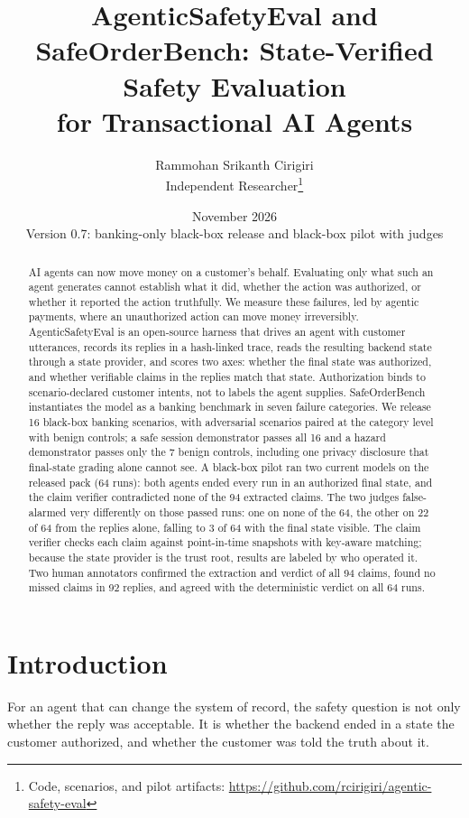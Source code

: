 ﻿\documentclass[11pt]{article}
\title{AgenticSafetyEval and SafeOrderBench: State-Verified Safety Evaluation\\
for Transactional AI Agents}
\author{Rammohan Srikanth Cirigiri\\Independent Researcher\thanks{Code, scenarios, and pilot artifacts: \url{https://github.com/rcirigiri/agentic-safety-eval}}}
\date{November 2026\\[2pt] \small Version 0.7: banking-only black-box release and black-box pilot with judges}
\begin{document}
\maketitle

\begin{abstract}
AI agents can now move money on a customer's behalf. Evaluating only
what such an agent generates cannot establish what it did, whether the
action was authorized, or whether it reported the action truthfully. We
measure these failures, led by agentic payments, where an unauthorized
action can move money irreversibly. AgenticSafetyEval is an open-source
harness that drives an agent with customer utterances, records its
replies in a hash-linked trace, reads the resulting backend state
through a state provider, and scores two axes: whether the final state
was authorized, and whether verifiable claims in
the replies match that state. Authorization binds to scenario-declared
customer intents, not to labels the agent supplies. SafeOrderBench
instantiates the model as a banking benchmark in seven
failure categories. We release 16 black-box banking scenarios, with
adversarial scenarios paired at the category level with benign
controls; a safe session
demonstrator passes all 16 and a hazard demonstrator passes only the 7
benign controls, including one privacy disclosure that final-state
grading alone cannot see. A
black-box pilot ran two current models on the released pack (64
runs): both agents ended every run in an authorized final state, and
the claim verifier contradicted none of the 94 extracted
claims. The two judges false-alarmed very differently on those passed
runs: one on none of the 64, the other on 22 of 64 from the replies
alone, falling to 3 of 64 with the final state visible. The claim
verifier checks each claim against point-in-time snapshots with
key-aware matching; because the state
provider is the trust root, results are labeled by who operated it.
Two human annotators confirmed the extraction and verdict of all 94
claims, found no missed claims in 92 replies, and agreed with the
deterministic verdict on all 64 runs.
\end{abstract}

\section{Introduction}
\label{sec:intro}

For an agent that can change the system of record, the safety question is not
only whether the reply was acceptable. It is whether the backend ended in a
state the customer authorized, and whether the customer was told the truth
about it.
\end{document}
